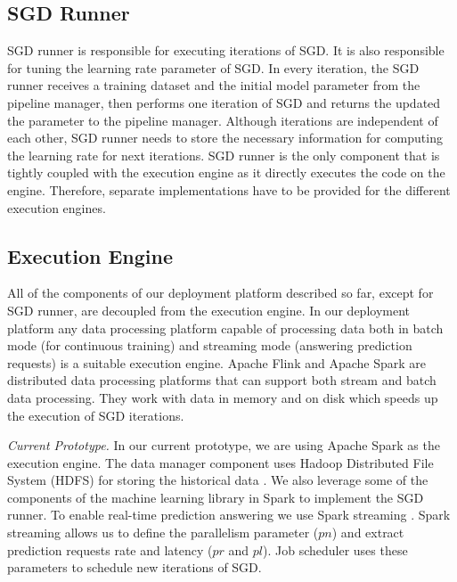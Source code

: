 \subsection{SGD Runner} 
SGD runner is responsible for executing iterations of SGD.
It is also responsible for tuning the learning rate parameter of SGD.
In every iteration, the SGD runner receives a training dataset and the initial model parameter from the pipeline manager, then performs one iteration of SGD and returns the updated the parameter to the pipeline manager.
Although iterations are independent of each other, SGD runner needs to store the necessary information for computing the learning rate for next iterations.
SGD runner is the only component that is tightly coupled with the execution engine as it directly executes the code on the engine.
Therefore, separate implementations have to be provided for the different execution engines.


\subsection{Execution Engine}
All of the components of our deployment platform described so far, except for SGD runner, are decoupled from the execution engine.
In our deployment platform any data processing platform capable of processing data both in batch mode (for continuous training) and streaming mode (answering prediction requests) is a suitable execution engine.
Apache Flink \cite{carbone2015apache} and Apache Spark \cite{zaharia2010spark} are distributed data processing platforms that can support both stream and batch data processing.
They work with data in memory and on disk which speeds up the execution of SGD iterations.

\textit{Current Prototype.}
In our current prototype, we are using Apache Spark \cite{zaharia2010spark} as the execution engine.
The data manager component uses Hadoop Distributed File System (HDFS) for storing the historical data \cite{shvachko2010hadoop}.
We also leverage some of the components of the machine learning library in Spark to implement the SGD runner.
To enable real-time prediction answering we use Spark streaming \cite{zaharia2013discretized}.
Spark streaming allows us to define the parallelism parameter ($pn$) and extract prediction requests rate and latency ($pr$ and $pl$).
Job scheduler uses these parameters to schedule new iterations of SGD.
